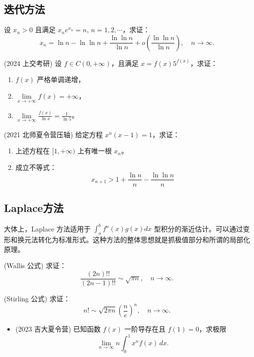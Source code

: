 \documentclass[lang=cn,10pt,thmcnt=section]{elegantbook}
\begin{document}
\subsection{迭代方法}
\begin{example}
	设 $x_n > 0$ 且满足 $x_n e^{x_n} = n$, $n = 1, 2, \cdots$，求证：
\[
x_n = \ln n - \ln \ln n + \frac{\ln \ln n}{\ln n} + o\left(\frac{\ln \ln n}{\ln n}\right), \quad n \to \infty.
\]
\end{example}
\begin{example}
	(2024 上交考研) 设 $f \in C(0, +\infty)$，且满足 $x = f(x)5^{f(x)}$，求证：
\begin{enumerate}
    \item $f(x)$ 严格单调递增，
    \item $\lim\limits_{x \to +\infty} f(x) = +\infty$，
    \item $\lim\limits_{x \to +\infty} \frac{f(x)}{\ln x} = \frac{1}{\ln 5}$。
\end{enumerate}
\end{example}
\begin{example}
	(2021 北师夏令营压轴) 给定方程 $x^n(x-1) = 1$，求证：

\begin{enumerate}
    \item 上述方程在 $[1, +\infty)$ 上有唯一根 $x_n$。
    \item 成立不等式：
    \[
    x_{n+1} > 1 + \frac{\ln n}{n} - \frac{\ln \ln n}{n}
    \]
\end{enumerate}
\end{example}
\subsection{Laplace方法}
大体上，Laplace 方法适用于 $\int_{a}^{b} f^n(x)g(x)dx$ 型积分的渐近估计。可以通过变形和换元法转化为标准形式。这种方法的整体思想就是抓极值部分和所谓的局部化原理。
\begin{example}
	(Wallis 公式) 求证：
\[
\frac{(2n)!!}{(2n-1)!!} \sim \sqrt{\pi n}, \quad n \to \infty.
\]
\end{example}
\begin{example}
	(Stirling 公式) 求证：
\[
n! \sim \sqrt{2\pi n}\left(\frac{n}{e}\right)^n, \quad n \to \infty.
\]

\end{example}
\begin{example}
	\begin{itemize}
		\item (2023 吉大夏令营) 已知函数 $f(x)$ 一阶导存在且 $f(1) = 0$，求极限
		\[
		\lim_{n \to \infty} n \int_{0}^{1} x^{n} f(x) \, dx.
		\]
	\end{itemize}
\end{example}
\end{document}
